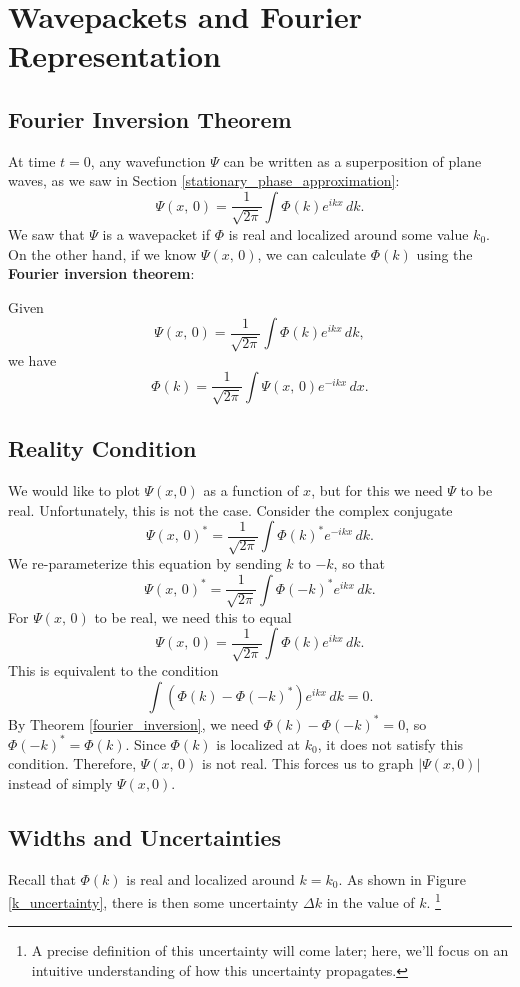 \section{Wavepackets and Fourier Representation}

\subsection{Fourier Inversion Theorem}\label{section_fourier_inversion}

At time $t=0$, any wavefunction $\Psi$ can be written as a superposition of plane waves, as we saw in Section \ref{stationary_phase_approximation}:$$\Psi(x,\,0)=\frac{1}{\sqrt{2\pi}}\int\Phi(k)e^{ikx}\,dk.$$We saw that $\Psi$ is a wavepacket if $\Phi$ is real and localized around some value $k_0$. On the other hand, if we know $\Psi(x,\,0)$, we can calculate $\Phi(k)$ using the \textbf{Fourier inversion theorem}:  

\begin{framedthm}\label{fourier_inversion}
    Given $$\Psi(x,\,0)=\frac{1}{\sqrt{2\pi}}\int\Phi(k)e^{ikx}\,dk,$$ we have $$\Phi(k)=\frac{1}{\sqrt{2\pi}}\int\Psi(x,\,0)e^{-ikx}\,dx.$$
\end{framedthm}

\subsection{Reality Condition}
\label{reality_condition}

We would like to plot $\Psi(x,0)$ as a function of $x$, but for this we need $\Psi$ to be real. Unfortunately, this is not the case. Consider the complex conjugate $$\Psi(x,\,0)^*=\frac{1}{\sqrt{2\pi}}\int\Phi(k)^*e^{-ikx}\,dk.$$We re-parameterize this equation by sending $k$ to $-k$, so that $$\Psi(x,\,0)^*=\frac{1}{\sqrt{2\pi}}\int\Phi(-k)^*e^{ikx}\,dk.$$For $\Psi(x,\,0)$ to be real, we need this to equal $$\Psi(x,\,0)=\frac{1}{\sqrt{2\pi}}\int\Phi(k)e^{ikx}\,dk.$$This is equivalent to the condition $$\int(\Phi(k)-\Phi(-k)^*)e^{ikx}\,dk=0.$$By Theorem \ref{fourier_inversion}, we need $\Phi(k)-\Phi(-k)^*=0$, so $\Phi(-k)^*=\Phi(k)$. Since $\Phi(k)$ is localized at $k_0$, it does not satisfy this condition. Therefore, $\Psi(x,\,0)$ is not real. This forces us to graph $|\Psi(x,0)|$ instead of simply $\Psi(x,0)$.

\subsection{Widths and Uncertainties}\label{widths_uncertainties}
Recall that $\Phi(k)$ is real and localized around $k=k_0$. As shown in Figure \ref{k_uncertainty}, there is then some uncertainty $\Delta k$ in the value of $k$. \footnote{A precise definition of this uncertainty will come later; here, we'll focus on an intuitive understanding of how this uncertainty propagates. }

